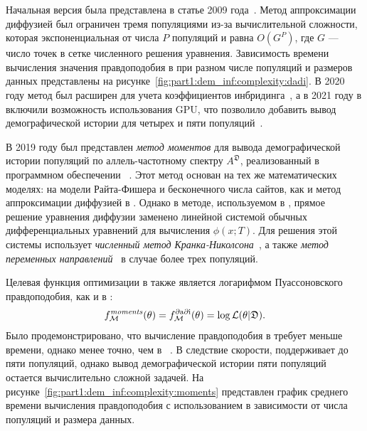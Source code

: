 Начальная версия \dadi была представлена в статье 2009 года~\cite{gutenkunst2009inferring}.
Метод аппроксимации диффузией был ограничен тремя популяциями из-за вычислительной сложности, которая экспоненциальная от числа $P$ популяций и равна $O(G^P)$, где $G$ --- число точек в сетке численного решения уравнения.
Зависимость времени вычисления значения правдоподобия в \dadi при разном числе популяций и размеров данных представлены на рисунке~\ref{fig:part1:dem_inf:complexity:dadi}.
В 2020 году метод был расширен для учета коэффициентов инбридинга~\cite{blischak2020inferring}, а в 2021 году в \dadi включили возможность использования GPU, что позволило добавить вывод демографической истории для четырех и пяти популяций~\cite{gutenkunst2021dadi}.

В 2019 году был представлен \emph{метод моментов} для вывода демографической истории популяций по аллель-частотному спектру $A^{\mathfrak{D}}$, реализованный в программном обеспечении \moments~\cite{jouganous2017inferring}.
Этот метод основан на тех же математических моделях: на модели Райта-Фишера и бесконечного числа сайтов, как и метод аппроксимации диффузией в \dadi.
Однако в методе, используемом в \moments, прямое решение уравнения диффузии заменено линейной системой обычных дифференциальных уравнений для вычисления $\phi(x; T)$.
Для решения этой системы \moments использует \textit{численный метод Кранка-Николсона}~\cite{crank1947practical}, а также \textit{метод переменных направлений}~\cite{baolin1994alternating} в случае более трех популяций.

Целевая функция оптимизации в \moments также является логарифмом Пуассоновского правдоподобия, как и в \dadi:
$$f^{\text{\textit{moments}}}_\mathcal{M}(\theta) = f^{\text{$\partial$a$\partial$i}}_\mathcal{M}(\theta) = \log \mathcal{L}(\theta|\mathfrak{D}).$$
Было продемонстрировано, что вычисление правдоподобия в \moments требует меньше времени, однако менее точно, чем в \dadi~\cite{jouganous2017inferring}.
В следствие скорости, \moments поддерживает до пяти популяций, однако вывод демографической истории пяти популяций остается вычислительно сложной задачей.
На рисунке~\ref{fig:part1:dem_inf:complexity:moments} представлен график среднего времени вычисления правдоподобия с использованием \moments в зависимости от числа популяций и размера данных.

